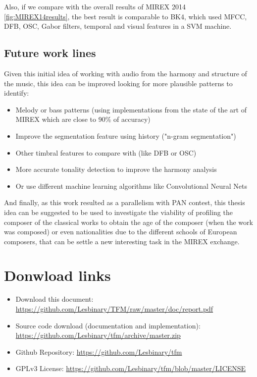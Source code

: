 \documentclass[a4paper,openany,oneside,12pt]{book}
\begin{document}
Also, if we compare with the overall results of MIREX 2014 \ref{fig:MIREX14results}, the best result is comparable to BK4, which used MFCC, DFB, OSC, Gabor filters, temporal and visual features in a SVM machine\cite{seung-ryoel}.

 

\section{Future work lines}
Given this initial idea of working with audio from the harmony and structure of the music, this idea can be improved looking for more plausible patterns to identify:

\begin{itemize}
\item Melody or bass patterns (using implementations from the state of the art of MIREX which are close to 90\% of accuracy)
\item Improve the segmentation feature using history ("n-gram segmentation")
\item Other timbral features to compare with (like DFB or OSC)
\item More accurate tonality detection to improve the harmony analysis
\item Or use different machine learning algorithms like Convolutional Neural Nets
\end{itemize}

And finally, as this work resulted as a parallelism with PAN contest, this thesis idea can be suggested to be used to investigate the viability of profiling the composer of the classical works to obtain the age of the composer (when the work was composed) or even nationalities due to the different schools of European composers, that can be settle a new interesting task in the MIREX exchange.




\nocite{*}
\cleardoublepage
{}






\newpage
\thispagestyle{empty}
\mbox{}


\appendix
\chapter{Donwload links}\label{links}
\begin{itemize}

\item Download this document: \url{https://github.com/Lesbinary/TFM/raw/master/doc/report.pdf}

\item Source code download (documentation and implementation): \url{https://github.com/Lesbinary/tfm/archive/master.zip}

\item Github Repository: \url{https://github.com/Lesbinary/tfm}

\item GPLv3 License: \url{https://github.com/Lesbinary/tfm/blob/master/LICENSE}

\end{itemize}
\end{document}
